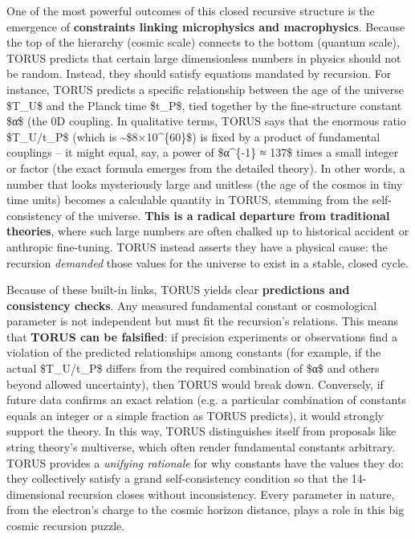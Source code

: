 One of the most powerful outcomes of this closed recursive structure is
the emergence of \textbf{constraints linking microphysics and
macrophysics}. Because the top of the hierarchy (cosmic scale) connects
to the bottom (quantum scale), TORUS predicts that certain large
dimensionless numbers in physics should not be random. Instead, they
should satisfy equations mandated by recursion. For instance, TORUS
predicts a specific relationship between the age of the universe
\$T\_U\$ and the Planck time \$t\_P\$, tied together by the
fine-structure constant \$α\$ (the 0D coupling. In qualitative terms,
TORUS says that the enormous ratio \$T\_U/t\_P\$ (which is
\textasciitilde{}\$8×10\^{}\{60\}\$) is fixed by a product of
fundamental couplings -- it might equal, say, a power of \$α\^{}\{-1\} ≈
137\$ times a small integer or factor (the exact formula emerges from
the detailed theory). In other words, a number that looks mysteriously
large and unitless (the age of the cosmos in tiny time units) becomes a
calculable quantity in TORUS, stemming from the self-consistency of the
universe. \textbf{This is a radical departure from traditional
theories}, where such large numbers are often chalked up to historical
accident or anthropic fine-tuning. TORUS instead asserts they have a
physical cause: the recursion \emph{demanded} those values for the
universe to exist in a stable, closed cycle​.

Because of these built-in links, TORUS yields clear \textbf{predictions
and consistency checks}. Any measured fundamental constant or
cosmological parameter is not independent but must fit the recursion's
relations. This means that \textbf{TORUS can be falsified}: if precision
experiments or observations find a violation of the predicted
relationships among constants (for example, if the actual \$T\_U/t\_P\$
differs from the required combination of \$α\$ and others beyond allowed
uncertainty), then TORUS would break down​. Conversely, if future data
confirms an exact relation (e.g. a particular combination of constants
equals an integer or a simple fraction as TORUS predicts), it would
strongly support the theory. In this way, TORUS distinguishes itself
from proposals like string theory's multiverse, which often render
fundamental constants arbitrary. TORUS provides a \emph{unifying
rationale} for why constants have the values they do: they collectively
satisfy a grand self-consistency condition so that the 14-dimensional
recursion closes without inconsistency. Every parameter in nature, from
the electron's charge to the cosmic horizon distance, plays a role in
this big cosmic recursion puzzle.

